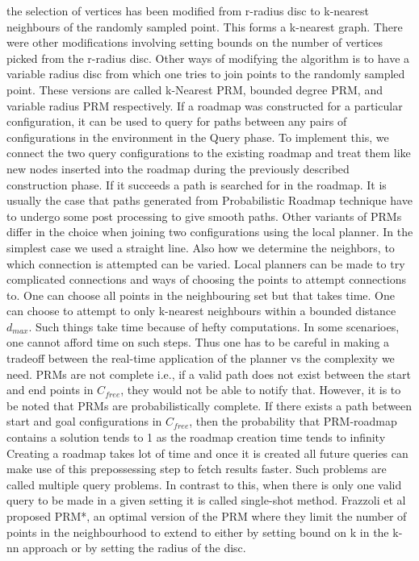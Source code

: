 \documentclass[MTech]{iitmdiss}
\begin{document}
 the selection of vertices has been modified from r-radius disc to k-nearest neighbours of the randomly sampled point. This forms a k-nearest graph. There were other modifications involving setting bounds on the number of vertices picked from the r-radius disc. Other ways of modifying the algorithm is to have a variable radius disc from which one tries to join points to the randomly sampled point. These versions are called k-Nearest PRM, bounded degree PRM, and variable radius PRM respectively. If a roadmap was constructed for a particular configuration, it can be used to query for paths between any pairs of configurations in the environment in the Query phase. To implement this, we connect the two query configurations to the existing roadmap and treat them like new nodes inserted into the roadmap during the previously described construction phase. If it succeeds a path is searched for in the roadmap. It is usually the case that paths generated from Probabilistic Roadmap technique have to undergo some post processing to give smooth paths. Other variants of PRMs differ in the choice when joining two configurations using the local planner. In the simplest case we used a straight line. Also how we determine the neighbors, to which connection is attempted can be varied. Local planners can be made to try complicated connections and ways of choosing the points to attempt connections to. One can choose all points in the neighbouring set but that takes time. One can choose to attempt to only k-nearest neighbours within a bounded distance $d_{max}$. Such things take time because of hefty computations. In some scenarioes, one cannot afford time on such steps. Thus one has to be careful in making a tradeoff between the real-time application of the planner vs the complexity we need. PRMs are not complete i.e., if a valid path does not exist between the start and end points in $C_{free}$, they would not be able to notify that. However, it is to be noted that PRMs are probabilistically complete. If there exists a path between start and goal configurations in $C_{free}$, then the probability that PRM-roadmap contains a solution tends to 1 as the roadmap creation time tends to infinity
 \cite{kavraki98}
 Creating a roadmap takes lot of time and once it is created all future queries can make use of this prepossessing step to fetch results faster. Such problems are called multiple query problems. In contrast to this, when there is only one valid query to be made in a given setting it is called single-shot method. Frazzoli et al 
\cite{karaman11} 
 proposed PRM*, an optimal version of the PRM where they limit the number of points in the neighbourhood to extend to either by setting bound on k in the k-nn approach or by setting the radius of the disc. 
\end{document}
